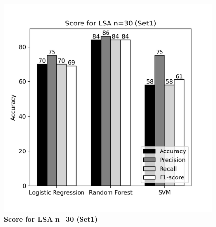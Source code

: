 \documentclass[12pt]{report}
\begin{document}
\begin{figure}[!htb]
\begin{minipage}{0.48\textwidth}
                  \includegraphics[scale=0.55]{plots/Score for LSA n=30 (Set1).png}
                  \caption{\textbf{Score for LSA n=30 (Set1)}}\label{Fig:typo2}
                \end{minipage}
             \end{figure}
\end{document}
